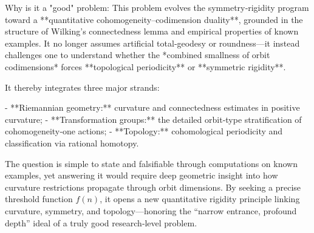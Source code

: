 Why is it a "good" problem:  
This problem evolves the symmetry‑rigidity program toward a **quantitative cohomogeneity–codimension duality**, grounded in the structure of Wilking’s connectedness lemma and empirical properties of known examples.  
It no longer assumes artificial total‑geodesy or roundness—it instead challenges one to understand whether the *combined smallness of orbit codimensions* forces **topological periodicity** or **symmetric rigidity**.  

It thereby integrates three major strands:

- **Riemannian geometry:** curvature and connectedness estimates in positive curvature;
- **Transformation groups:** the detailed orbit‑type stratification of cohomogeneity‑one actions;
- **Topology:** cohomological periodicity and classification via rational homotopy.  

The question is simple to state and falsifiable through computations on known examples, yet answering it would require deep geometric insight into how curvature restrictions propagate through orbit dimensions. By seeking a precise threshold function \(f(n)\), it opens a new quantitative rigidity principle linking curvature, symmetry, and topology—honoring the “narrow entrance, profound depth” ideal of a truly good research‑level problem.
